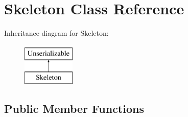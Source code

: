 \hypertarget{class_skeleton}{\section{\-Skeleton \-Class \-Reference}
\label{class_skeleton}
}
\-Inheritance diagram for \-Skeleton\-:\begin{figure}[H]
\begin{center}
\leavevmode
\includegraphics[height=2.000000cm]{class_skeleton}
\end{center}
\end{figure}
\subsection*{\-Public \-Member \-Functions}
